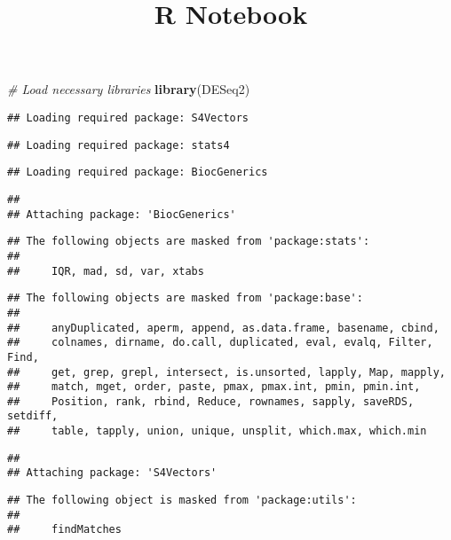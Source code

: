 \documentclass[
]{article}
\title{R Notebook}
\author{}
\date{\vspace{-2.5em}}
\newenvironment{Shaded}{\begin{snugshade}}{\end{snugshade}}
\newcommand{\CommentTok}[1]{\textcolor[rgb]{0.56,0.35,0.01}{\textit{#1}}}
\newcommand{\FunctionTok}[1]{\textcolor[rgb]{0.13,0.29,0.53}{\textbf{#1}}}
\newcommand{\NormalTok}[1]{#1}
\begin{document}
\maketitle

\begin{Shaded}
\begin{Highlighting}[]
\CommentTok{\# Load necessary libraries}
\FunctionTok{library}\NormalTok{(DESeq2)}
\end{Highlighting}
\end{Shaded}

\begin{verbatim}
## Loading required package: S4Vectors
\end{verbatim}

\begin{verbatim}
## Loading required package: stats4
\end{verbatim}

\begin{verbatim}
## Loading required package: BiocGenerics
\end{verbatim}

\begin{verbatim}
## 
## Attaching package: 'BiocGenerics'
\end{verbatim}

\begin{verbatim}
## The following objects are masked from 'package:stats':
## 
##     IQR, mad, sd, var, xtabs
\end{verbatim}

\begin{verbatim}
## The following objects are masked from 'package:base':
## 
##     anyDuplicated, aperm, append, as.data.frame, basename, cbind,
##     colnames, dirname, do.call, duplicated, eval, evalq, Filter, Find,
##     get, grep, grepl, intersect, is.unsorted, lapply, Map, mapply,
##     match, mget, order, paste, pmax, pmax.int, pmin, pmin.int,
##     Position, rank, rbind, Reduce, rownames, sapply, saveRDS, setdiff,
##     table, tapply, union, unique, unsplit, which.max, which.min
\end{verbatim}

\begin{verbatim}
## 
## Attaching package: 'S4Vectors'
\end{verbatim}

\begin{verbatim}
## The following object is masked from 'package:utils':
## 
##     findMatches
\end{verbatim}
\end{document}
